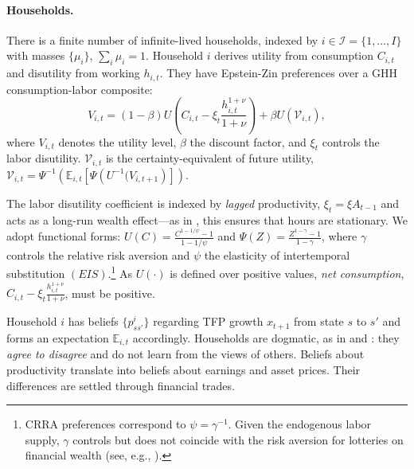 
\paragraph{Households.}

There is a finite number of infinite-lived households, indexed by $i \in \mathcal{I}= \{1, \ldots, I\}$ with masses $\{\mu_i\}$, $\sum_i \mu_i = 1$. Household $i$ derives utility from consumption $C_{i,t}$ and disutility from working $h_{i,t}$. They have Epstein-Zin preferences over a GHH consumption-labor composite:
\begin{equation}\label{eq: preferences}
    V_{i,t} = (1-\beta) U\left(C_{i,t} - \xi_t \frac{h_{i,t}^{1+\nu}}{1+\nu}\right) + \beta U\left( \mathcal{V}_{i,t} \right),
\end{equation}
where $V_{i,t}$ denotes the utility level, $\beta$ the discount factor, and $\xi_t$ controls the labor disutility. $\mathcal{V}_{i,t}$ is the certainty-equivalent of future utility, $\mathcal{V}_{i,t} = \Psi^ {-1}\left( \mathbb{E}_{i,t}\left[ \Psi\left( U^ {-1}(V_{i,t+1}\right)\right] \right)$.

The labor disutility coefficient is indexed by \textit{lagged} productivity, $\xi_{t} = \xi A_{t-1}$ and acts as a long-run wealth effect---as in \citet{JR09}, this ensures that hours are stationary. We adopt functional forms: $U(C) = \frac{C^{1-1/\psi}-1}{1-1/\psi}$ and $\Psi(Z) = \frac{Z^{1-\gamma} -1}{1-\gamma}$, where $\gamma$ controls the relative risk aversion and $\psi$ the elasticity of intertemporal substitution $(EIS)$.\footnote{CRRA preferences correspond to $\psi = \gamma^{-1}$.
Given the endogenous labor supply, $\gamma$ controls but does not coincide with the risk aversion for lotteries on financial wealth (see, e.g., \citealt{swanson2018risk}).
} As $U(\cdot)$ is defined over positive values, \textit{net consumption}, $C_{i,t} - \xi_t \frac{h_{i,t}^{1+\nu}}{1+\nu}$, must be positive.

Household $i$ has beliefs $\{p^i_{ss'}\}$ regarding TFP growth $x_{t+1}$ from state $s$ to $s'$ and forms an expectation $\mathbb{E}_{i,t}$ accordingly. Households are dogmatic, as in \citet{chen2012rare} and \citet{simsek2013speculation}: they \textit{agree to disagree} and do not learn from the views of others. 
Beliefs about productivity translate into beliefs about earnings and asset prices. Their differences are settled through financial trades. 

